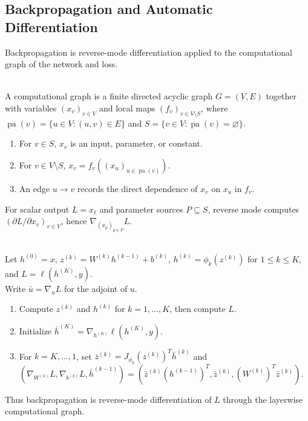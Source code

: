 \subsection{Backpropagation and Automatic Differentiation}

Backpropagation is reverse-mode differentiation applied to the computational graph of the network and loss.

\begin{definition} \label{def:sl-computational-graph} \\
A computational graph is a finite directed acyclic graph $G=(V,E)$ together with variables $(x_v)_{v\in V}$ and local maps $(f_v)_{v\in V\setminus S}$, where $\operatorname{pa}(v)=\{u\in V:(u,v)\in E\}$ and $S=\{v\in V:\operatorname{pa}(v)=\varnothing\}$.
\begin{enumerate}[label=(\roman*)]
\setlength{\itemsep}{0pt}
\item For $v\in S$, $x_v$ is an input, parameter, or constant.
\item For $v\in V\setminus S$, $x_v=f_v((x_u)_{u\in\operatorname{pa}(v)})$.
\item An edge $u\to v$ records the direct dependence of $x_v$ on $x_u$ in $f_v$.
\end{enumerate}
For scalar output $L=x_\ell$ and parameter sources $P\subseteq S$, reverse mode computes $(\partial L/\partial x_v)_{v\in V}$, hence $\nabla_{(x_p)_{p\in P}}L$.
\end{definition}

\begin{method} \label{method:sl-backpropagation} \\
Let $h^{(0)}=x$, $z^{(k)}=W^{(k)}h^{(k-1)}+b^{(k)}$, $h^{(k)}=\phi_k(z^{(k)})$ for $1\leq k\leq K$, and $L=\ell(h^{(K)},y)$.\\
Write $\bar u=\nabla_u L$ for the adjoint of $u$.
\begin{enumerate}[label=(\roman*)]
\setlength{\itemsep}{0pt}
\item Compute $z^{(k)}$ and $h^{(k)}$ for $k=1,\ldots,K$, then compute $L$.
\item Initialize $\bar h^{(K)}=\nabla_{h^{(K)}}\ell(h^{(K)},y)$.
\item For $k=K,\ldots,1$, set $\bar z^{(k)}=J_{\phi_k}(z^{(k)})^T\bar h^{(k)}$ and $(\nabla_{W^{(k)}}L,\nabla_{b^{(k)}}L,\bar h^{(k-1)})=(\bar z^{(k)}(h^{(k-1)})^T,\bar z^{(k)},(W^{(k)})^T\bar z^{(k)})$.
\end{enumerate}
Thus backpropagation is reverse-mode differentiation of $L$ through the layerwise computational graph.
\end{method}

